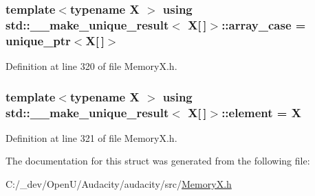 \subsubsection[{\texorpdfstring{array\+\_\+case}{array_case}}]{\setlength{\rightskip}{0pt plus 5cm}template$<$typename X $>$ using {\bf std\+::\+\_\+\+\_\+make\+\_\+unique\+\_\+result}$<$ X\mbox{[}$\,$\mbox{]}$>$\+::{\bf array\+\_\+case} =  unique\+\_\+ptr$<$X\mbox{[}$\,$\mbox{]}$>$}\hypertarget{structstd_1_1____make__unique__result_3_01_x[]_4_ae15324f7a78c793a870a1f668faa219f}{}\label{structstd_1_1____make__unique__result_3_01_x[]_4_ae15324f7a78c793a870a1f668faa219f}


Definition at line 320 of file Memory\+X.\+h.

\subsubsection[{\texorpdfstring{element}{element}}]{\setlength{\rightskip}{0pt plus 5cm}template$<$typename X $>$ using {\bf std\+::\+\_\+\+\_\+make\+\_\+unique\+\_\+result}$<$ X\mbox{[}$\,$\mbox{]}$>$\+::{\bf element} =  X}\hypertarget{structstd_1_1____make__unique__result_3_01_x[]_4_a065f62811af74c831185d39e38fa3c45}{}\label{structstd_1_1____make__unique__result_3_01_x[]_4_a065f62811af74c831185d39e38fa3c45}


Definition at line 321 of file Memory\+X.\+h.



The documentation for this struct was generated from the following file\+:\begin{DoxyCompactItemize}
\item 
C\+:/\+\_\+dev/\+Open\+U/\+Audacity/audacity/src/\hyperlink{_memory_x_8h}{Memory\+X.\+h}\end{DoxyCompactItemize}
